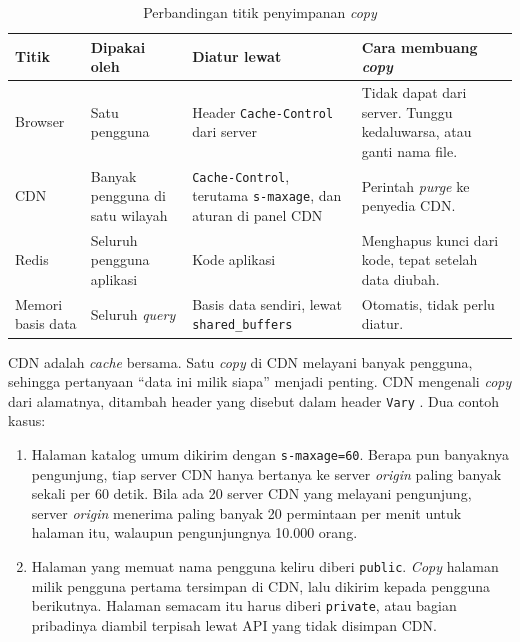 \begin{table}[!htb]
  \centering
  \caption{Perbandingan titik penyimpanan \textit{copy}}
  \label{tab:lapisan-cache}
  \begin{tabularx}{\textwidth}{lXXX}
    \hline
    \textbf{Titik} & \textbf{Dipakai oleh} & \textbf{Diatur lewat} & \textbf{Cara membuang \textit{copy}} \\
    \hline
    Browser & Satu pengguna & Header \texttt{Cache-Control} dari server & Tidak dapat dari server. Tunggu kedaluwarsa, atau ganti nama file. \\
    \hline
    CDN & Banyak pengguna di satu wilayah & \texttt{Cache-Control}, terutama \texttt{s-maxage}, dan aturan di panel CDN & Perintah \textit{purge} ke penyedia CDN. \\
    \hline
    Redis & Seluruh pengguna aplikasi & Kode aplikasi & Menghapus kunci dari kode, tepat setelah data diubah. \\
    \hline
    Memori basis data & Seluruh \textit{query} & Basis data sendiri, lewat \texttt{shared\_buffers} & Otomatis, tidak perlu diatur. \\
    \hline
  \end{tabularx}
\end{table}

CDN adalah \textit{cache} bersama. Satu \textit{copy} di CDN melayani banyak
pengguna, sehingga pertanyaan ``data ini milik siapa'' menjadi penting. CDN
mengenali \textit{copy} dari alamatnya, ditambah header yang disebut dalam header
\texttt{Vary} \cite{rfc9110}. Dua contoh kasus:

\begin{enumerate}
  \item Halaman katalog umum dikirim dengan \texttt{s-maxage=60}. Berapa pun
        banyaknya pengunjung, tiap server CDN hanya bertanya ke server \textit{origin}
        paling banyak sekali per 60 detik. Bila ada 20 server CDN yang melayani
        pengunjung, server \textit{origin} menerima paling banyak 20 permintaan per menit
        untuk halaman itu, walaupun pengunjungnya 10.000 orang.
  \item Halaman yang memuat nama pengguna keliru diberi \texttt{public}.
        \textit{Copy} halaman milik pengguna pertama tersimpan di CDN, lalu dikirim
        kepada pengguna berikutnya. Halaman semacam itu harus diberi
        \texttt{private}, atau bagian pribadinya diambil terpisah lewat API
        yang tidak disimpan CDN.
\end{enumerate}

